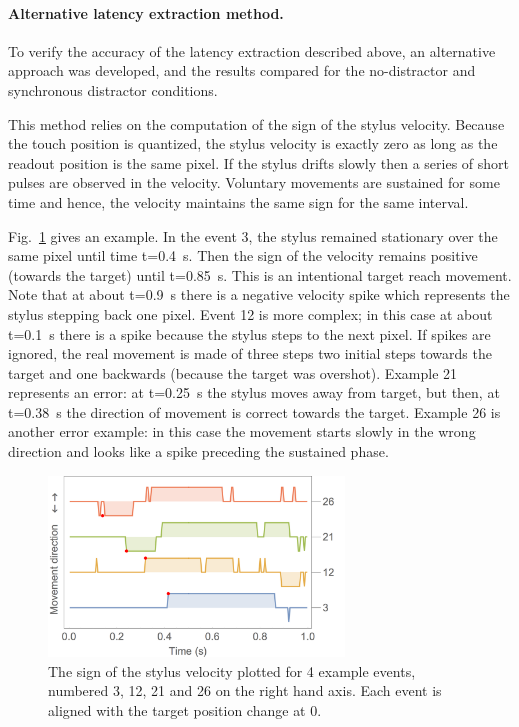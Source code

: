 \documentclass[10pt,letterpaper]{article}
\begin{document}
\paragraph{Alternative latency extraction method.}

To verify the accuracy of the latency extraction described above, an
alternative approach was developed, and the results compared for the
no-distractor and synchronous distractor conditions.

This method relies on the computation of the sign of the stylus
velocity. Because the touch position is quantized, the stylus velocity
is exactly zero as long as the readout position is the same pixel. If
the stylus drifts slowly then a series of short pulses are observed in
the velocity. Voluntary movements are sustained for some time and
hence, the velocity maintains the same sign for the same interval.

Fig.~\ref{alt_method_move_dirn} gives an example. In the event 3, the
stylus remained stationary over the same pixel until time
t=0.4~s. Then the sign of the velocity remains positive (towards the
target) until t=0.85~s. This is an intentional target reach
movement. Note that at about t=0.9~s there is a negative velocity spike
which represents the stylus stepping back one pixel. Event 12 is more
complex; in this case at about t=0.1~s there is a spike because the
stylus steps to the next pixel. If spikes are ignored, the real
movement is made of three steps two initial steps towards the target
and one backwards (because the target was overshot). Example 21
represents an error: at t=0.25~s the stylus moves away from target,
but then, at t=0.38~s the direction of movement is correct towards the
target. Example 26 is another error example: in this case the movement
starts slowly in the wrong direction and looks like a spike preceding
the sustained phase.

\begin{figure}[htb!]
\centering
\includegraphics[width=0.7\textwidth]{./figures/alt_method_move_dirn.png}
\caption[Alternative method] {The sign of the stylus velocity plotted
  for 4 example events, numbered 3, 12, 21 and 26 on the right hand
  axis. Each event is aligned with the target position change at 0.}
\label{alt_method_move_dirn}
\end{figure}
\end{document}
